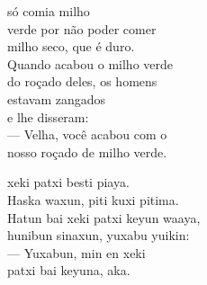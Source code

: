 
 só comia milho\\
verde por não poder comer\\
milho seco, que é duro.\\
Quando acabou o milho verde\\
do roçado deles, os homens\\
estavam zangados\\
e lhe disseram:\\
--- Velha, você acabou com o\\
nosso roçado de milho verde.\\

\vspace{2em}

 xeki patxi besti piaya.\\
Haska waxun, piti kuxi pitima.\\
Hatun bai xeki patxi keyun waaya,\\
hunibun sinaxun, yuxabu yuikin:\\
--- Yuxabun, min en xeki\\
patxi bai keyuna, aka.\\

\vspace*{\fill}

